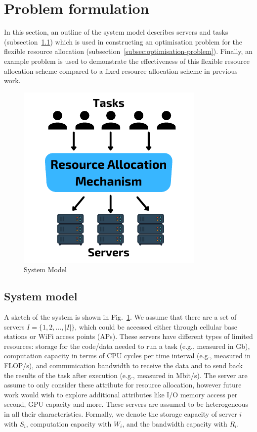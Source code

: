 \section{Problem formulation}\label{sec:problem-formulation}
In this section, an outline of the system model describes servers and tasks (subsection~\ref{subsec:system-model})
which is used in constructing an optimisation problem for the flexible resource allocation
(subsection~\ref{subsec:optimisation-problem}). Finally, an example problem is used to demonstrate the effectiveness of
this flexible resource allocation scheme compared to a fixed resource allocation scheme in previous work.

\begin{figure}[ht]
    \centering
    \includegraphics[width=0.6\linewidth]{figs/system_model.pdf}
    \caption{System Model}
    \label{fig:system-model}
\end{figure}

\subsection{System model}\label{subsec:system-model}
A sketch of the system is shown in Fig.~\ref{fig:system-model}.
We assume that there are a set of servers $I = \{1,2,\ldots,\left|I\right|\}$, which could be accessed either through
cellular base stations or WiFi access points (APs). These servers have different types of limited resources:
storage for the code/data needed to run a task (e.g., measured in Gb), computation capacity in terms of CPU cycles per
time interval (e.g., measured in FLOP/s), and communication bandwidth to receive the data and to send back the results
of the task after execution (e.g., measured in Mbit/s). The server are assume to only consider these attribute for
resource allocation, however future work would wish to explore additional attributes like I/O memory access per second,
GPU capacity and more. These servers are assumed to be heterogeneous in all their characteristics. Formally, we denote
the storage capacity of server $i$ with $S_i$, computation capacity with $W_i$, and the bandwidth capacity with $R_i$.

